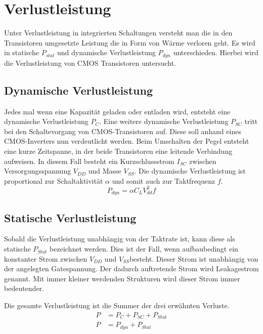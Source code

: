 \section{Verlustleistung}
\label{sec:verlustleistung}
Unter Verlustleistung in integrierten Schaltungen versteht man die in den Transistoren umgesetzte Leistung die in Form von Wärme verloren geht.
Es wird in statische \(P_{stat}\) und dynamische Verlustleistung \(P_{dyn}\) unterschieden. \cite[Seite 4 ff.]{flynn2007low} Hierbei wird die Verlustleistung von CMOS Transistoren untersucht.
\subsection{Dynamische Verlustleistung}\label{subsec:dynVerl}
Jedes mal wenn eine Kapazität geladen oder entladen wird, entsteht eine dynamische Verlustleistung \(P_C\). Eine weitere dynamische Verlustleistung \(P_{SC}\) tritt bei den Schaltevorgang von CMOS-Transistoren auf. Diese soll anhand eines CMOS-Inverters nun verdeutlicht werden. Beim Umschalten der Pegel entsteht eine kurze Zeitspanne, in der beide Transistoren eine leitende Verbindung aufweisen. In diesem Fall besteht ein Kurzschlussstrom \(I_{SC}\) zwischen Versorgungsspannung \(V_{DD}\) und Masse \(V_{SS}\). Die dynamische Verlustleistung ist proportional zur Schaltaktivität \(\alpha\) und somit auch zur Taktfrequenz $f$.\cite[Seite 4 ff.]{flynn2007low}
\begin{equation}
P_{dyn} = \alpha  C_L  V_{dd}^{2}  f
\label{eq:dynVerlustleistung}
\end{equation}
\subsection{Statische Verlustleistung}\label{subsec:statVerl}
Sobald die Verlustleistung unabhängig von der Taktrate ist, kann diese als statische \(P_{Stat}\) bezeichnet werden. Dies ist der Fall, wenn aufbaubedingt ein konstanter Strom zwischen \(V_{DD}\) und \(V_{SS}\)besteht. Dieser Strom ist unabhängig von der angelegten Gatespannung. Der dadurch auftretende Strom wird Leakagestrom genannt. Mit immer kleiner werdenden Strukturen wird dieser Strom immer bedeutender.\cite[Seite 8]{flynn2007low}

Die gesamte Verlustleistung ist die Summer der drei erwähnten Verluste.
\begin{equation}
\begin{aligned}
P &= P_{ C }+P_{ SC }+P_{ Stat}\\
P &= P_{dyn}+P_{Stat}
\label{eq:verlustleistung}
\end{aligned}
\end{equation}

